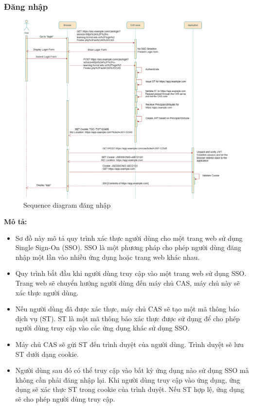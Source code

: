 \documentclass[a4paper]{article}
\begin{document}
\subsubsection{Đăng nhập}
\begin{figure}[h!]
\begin{center}
\includegraphics[width=16cm]{picture/Sequence_diagram_login-Trang-4.drawio.png}
\caption{Sequence diagram đăng nhập}
\end{center}
\end{figure}
\newpage
\noindent \textbf{Mô tả:}
\begin{itemize}
    \item Sơ đồ này mô tả quy trình xác thực người dùng cho một trang web sử dụng Single Sign-On (SSO). SSO là một phương pháp cho phép người dùng đăng nhập một lần vào nhiều ứng dụng hoặc trang web khác nhau.
    \item Quy trình bắt đầu khi người dùng truy cập vào một trang web sử dụng SSO. Trang web sẽ chuyển hướng người dùng đến máy chủ CAS, máy chủ này sẽ xác thực người dùng. 
    \item Nếu người dùng đã được xác thực, máy chủ CAS sẽ tạo một mã thông báo dịch vụ (ST). ST là một mã thông báo xác thực được sử dụng để cho phép người dùng truy cập vào các ứng dụng khác sử dụng SSO.
    \item Máy chủ CAS sẽ gửi ST đến trình duyệt của người dùng. Trình duyệt sẽ lưu ST dưới dạng cookie.
    \item Người dùng sau đó có thể truy cập vào bất kỳ ứng dụng nào sử dụng SSO mà không cần phải đăng nhập lại. Khi người dùng truy cập vào ứng dụng, ứng dụng sẽ xác thực ST trong cookie của trình duyệt. Nếu ST hợp lệ, ứng dụng sẽ cho phép người dùng truy cập.
\end{itemize}
\end{document}
